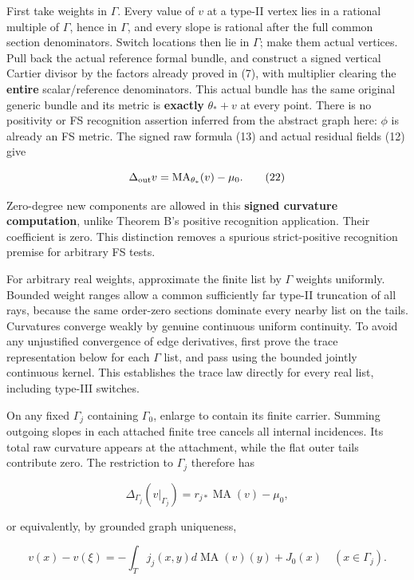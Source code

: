 \documentclass[
  11pt,
]{article}
\begin{document}
First take weights in \(\Gamma\). Every value of \(v\) at a type-II
vertex lies in a rational multiple of \(\Gamma\), hence in \(\Gamma\),
and every slope is rational after the full common section denominators.
Switch locations then lie in \(\Gamma\); make them actual vertices. Pull
back the actual reference formal bundle, and construct a signed vertical
Cartier divisor by the factors already proved in (7), with multiplier
clearing the \textbf{entire} scalar/reference denominators. This actual
bundle has the same original generic bundle and its metric is
\textbf{exactly} \(\theta_*+v\) at every point. There is no positivity
or FS recognition assertion inferred from the abstract graph here:
\(\phi\) is already an FS metric. The signed raw formula (13) and actual
residual fields (12) give

\[
                    \Delta_{
 \rm out}v=\operatorname{MA}_{\theta_*}(v)-\mu_0.                  \tag{22}
\]

Zero-degree new components are allowed in this \textbf{signed curvature
computation}, unlike Theorem B's positive recognition application. Their
coefficient is zero. This distinction removes a spurious strict-positive
recognition premise for arbitrary FS tests.

For arbitrary real weights, approximate the finite list by \(\Gamma\)
weights uniformly. Bounded weight ranges allow a common sufficiently far
type-II truncation of all rays, because the same order-zero sections
dominate every nearby list on the tails. Curvatures converge weakly by
genuine continuous uniform continuity. To avoid any unjustified
convergence of edge derivatives, first prove the trace representation
below for each \(\Gamma\) list, and pass using the bounded jointly
continuous kernel. This establishes the trace law directly for every
real list, including type-III switches.

On any fixed \(\Gamma_j\) containing \(\Gamma_0\), enlarge to contain
its finite carrier. Summing outgoing slopes in each attached finite tree
cancels all internal incidences. Its total raw curvature appears at the
attachment, while the flat outer tails contribute zero. The restriction
to \(\Gamma_j\) therefore has

\[
 \Delta_{\Gamma_j}(v|_{\Gamma_j})=r_{j*}\operatorname{MA}(v)-\mu_0,
\]

or equivalently, by grounded graph uniqueness,

\[
 v(x)-v(\xi)=-\int_T j_j(x,y)d\operatorname{MA}(v)(y)+J_0(x)
                       \quad(x\in\Gamma_j).                       \tag{23}
\]
\end{document}
